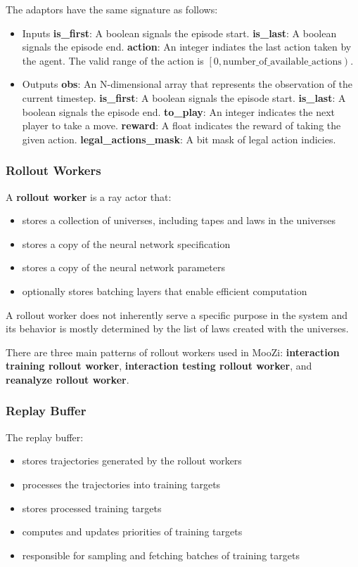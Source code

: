 \documentclass[12pt]{article}
\begin{document}
The adaptors have the same signature as follows:
\begin{itemize}
    \item Inputs
          \subitem \textbf{is\_first}: A boolean signals the episode start.
          \subitem \textbf{is\_last}: A boolean signals the episode end.
          \subitem \textbf{action}: An integer indiates the last action taken by the agent.
          The valid range of the action is $\left[0, \text{number\_of\_available\_actions}\right)$.
    \item Outputs
          \subitem \textbf{obs}:
          An N-dimensional array that represents the observation of the current timestep.
          \subitem \textbf{is\_first}: A boolean signals the episode start.
          \subitem \textbf{is\_last}: A boolean signals the episode end.
          \subitem \textbf{to\_play}: An integer indicates the next player to take a move.
          \subitem \textbf{reward}: A float indicates the reward of taking the given action.
          \subitem \textbf{legal\_actions\_mask}: A bit mask of legal action indicies.
\end{itemize}

\subsubsection{Rollout Workers}
A \textbf{rollout worker} is a ray actor that:
\begin{itemize}
    \item stores a collection of universes, including tapes and laws in the universes
    \item stores a copy of the neural network specification
    \item stores a copy of the neural network parameters
    \item optionally stores batching layers that enable efficient computation
\end{itemize}

A rollout worker does not inherently serve a specific purpose in the system and its behavior is mostly determined by the list of laws created with the universes.

There are three main patterns of rollout workers used in MooZi:
\textbf{interaction training rollout worker},
\textbf{interaction testing rollout worker},
and \textbf{reanalyze rollout worker}.

\subsubsection{Replay Buffer}
The replay buffer:
\begin{itemize}
    \item stores trajectories generated by the rollout workers
    \item processes the trajectories into training targets
    \item stores processed training targets
    \item computes and updates priorities of training targets
    \item responsible for sampling and fetching batches of training targets
\end{itemize}
\end{document}
